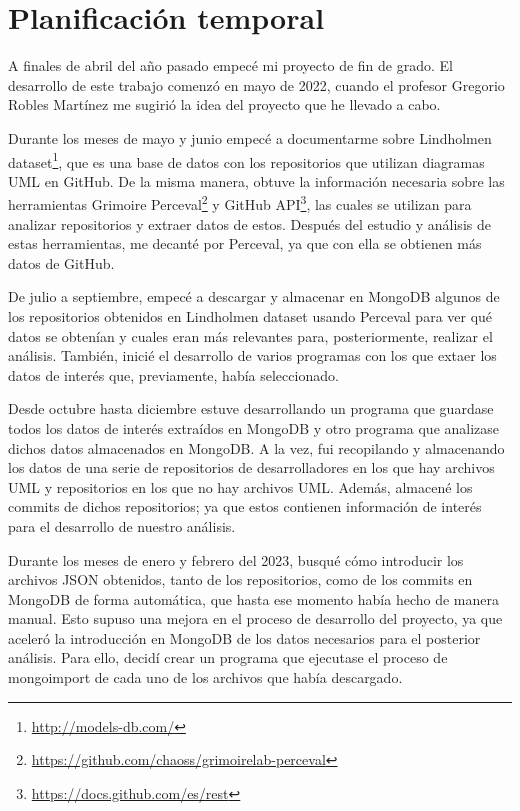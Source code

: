 \documentclass[a4paper, 12pt]{book}
\begin{document}
\section{Planificación temporal}
\label{sec:planificacion-temporal}

A finales de abril del año pasado empecé mi proyecto de fin de grado. 
El desarrollo de este trabajo comenzó en mayo de 2022, cuando el profesor Gregorio Robles Martínez me sugirió la idea del proyecto que he llevado a cabo. 


Durante los meses de mayo y junio empecé a documentarme sobre Lindholmen dataset\footnote{\url{http://models-db.com/}}, que es una base de datos con los repositorios que utilizan diagramas UML en GitHub.
De la misma manera, obtuve la información necesaria sobre las herramientas Grimoire Perceval\footnote{\url{https://github.com/chaoss/grimoirelab-perceval}} y GitHub API\footnote{\url{https://docs.github.com/es/rest}}, las cuales se utilizan para analizar repositorios y extraer datos de estos. 
Después del estudio y análisis de estas herramientas, me decanté por Perceval, ya que con ella se obtienen más datos de GitHub.


De julio a septiembre, empecé a descargar y almacenar en MongoDB algunos de los repositorios obtenidos en Lindholmen dataset usando Perceval para ver qué datos se obtenían y cuales eran más relevantes para, posteriormente, realizar el análisis.
También, inicié el desarrollo de varios programas con los que extaer los datos de interés que, previamente, había seleccionado.


Desde octubre hasta diciembre estuve desarrollando un programa que guardase todos los datos de interés extraídos en MongoDB y otro programa que analizase dichos datos almacenados en MongoDB.
A la vez, fui recopilando y almacenando los datos de una serie de repositorios de desarrolladores en los que hay archivos UML y repositorios en los que no hay archivos UML.
Además, almacené los commits de dichos repositorios; ya que estos contienen información de interés para el desarrollo de nuestro análisis.


Durante los meses de enero y febrero del 2023, busqué cómo introducir los archivos JSON obtenidos, tanto de los repositorios, como de los commits en MongoDB de forma automática, que hasta ese momento había hecho de manera manual.
Esto supuso una mejora en el proceso de desarrollo del proyecto, ya que aceleró la introducción en MongoDB de los datos necesarios para el posterior análisis.
Para ello, decidí crear un programa que ejecutase el proceso de mongoimport de cada uno de los archivos que había descargado. 
\end{document}
